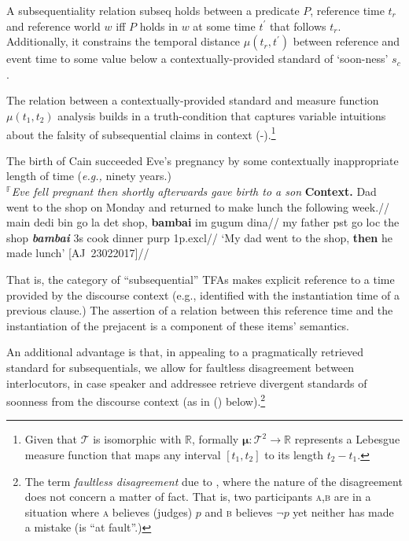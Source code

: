 	A subsequentiality relation {\sc subseq} holds between a predicate $P$, reference time $t_r$ and reference world $w$ iff $P$ holds in $w$ at some time $t^\prime$ that follows $t_r$.\\Additionally, it constrains the temporal distance $\mu(t_r,t^\prime)$ between reference and event time to some value below a contextually-provided standard of `soon-ness' $s_c$.\xe
	

The relation between a contextually-provided standard and measure function $\mu(t_1,t_2)$ analysis builds in a truth-condition that captures variable intuitions about the falsity of subsequential claims in context (\nextx-\anextx).\footnote{Given that $\mathcal T$ is isomorphic with $ \mathbb R $, formally $\boldsymbol\mu:\mathcal T^2\to \mathbb  R$ represents a Lebesgue measure function that maps any interval $ [t_1,t_2] $ to its length $t_2-t_1$.}

\pex\a The birth of Cain succeeded Eve's pregnancy by some contextually inappropriate length of time (\textit{e.g.,} ninety years.)\\
$ ^{\mathbb F} $\textit{Eve fell pregnant then shortly afterwards gave birth to a son}
\a\begingl\glpreamble\textbf{Context.} Dad went to the shop on Monday and returned to make lunch the following week.//
\gla {}main dedi bin go la det shop, \textbf{bambai} im gugum dina//
\glb my father {\sc pst} go {\sc loc} the shop \textit{\textbf{bambai}} 3s cook dinner {\sc purp} 1p{\sc.excl}//
\glft`My dad went to the shop, \textbf{then} he made lunch' \hspace*{\fill}[AJ~23022017]//
\endgl\xe


\noindent That is, the category of ``subsequential'' TFAs makes explicit reference to a time provided by the discourse context (e.g., identified with the instantiation time of a previous clause.) The assertion of a relation between this reference time and the instantiation of the prejacent is a component of these items' semantics.

 An additional advantage is that, in appealing to a pragmatically retrieved standard for subsequentials, we allow for faultless disagreement between interlocutors, in case speaker and addressee retrieve divergent standards of soonness from the discourse context (as in () below).\footnote{The term \textit{faultless disagreement} due to \citet[53-4]{Kolbel2004}, where the nature of the disagreement does not concern a matter of fact. That is, two participants \textsc{a,b} are in a situation where \textsc{a} believes (judges) $ p $ and \textsc{b} believes $ \neg p $ yet neither has made a mistake (is ``at fault''.)}

